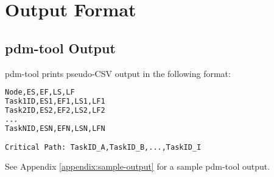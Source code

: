 \chapter{Output Format}

\section{pdm-tool Output}

pdm-tool prints pseudo-CSV output in the following format:

\begin{lstlisting}[language=python,frame=single,showstringspaces=false]
Node,ES,EF,LS,LF
Task1ID,ES1,EF1,LS1,LF1
Task2ID,ES2,EF2,LS2,LF2
...
TaskNID,ESN,EFN,LSN,LFN

Critical Path: TaskID_A,TaskID_B,...,TaskID_I
\end{lstlisting}

See Appendix \ref{appendix:sample-output} for a sample pdm-tool output.
